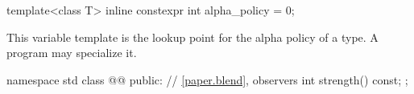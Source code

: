 %
\begin{itemdecl}
template<class T>
  inline constexpr int alpha_policy = 0;
\end{itemdecl}

\begin{itemdescr}
\pnum
\remarks
This variable template is the lookup point for the alpha policy of a type. A program may specialize it.
\end{itemdescr}

\begin{codeblock}
namespace std {
  class @@ {
  public:
    // \ref{paper.blend}, observers
    int strength() const;
  };
}
\end{codeblock}
